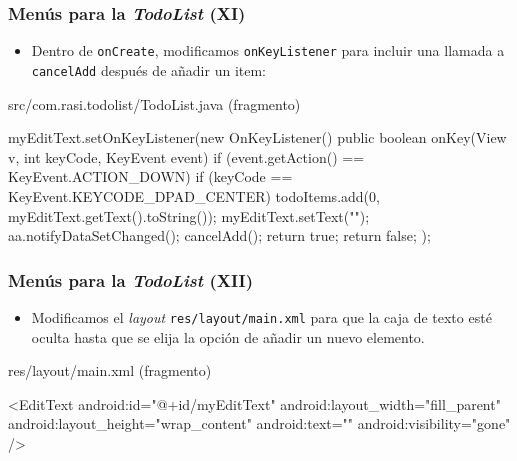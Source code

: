 \documentclass[hyperref={pdfpagelabels=true},ucs]{beamer}
\begin{document}
\begin{frame}[fragile]
\frametitle{Menús para la \emph{TodoList} (XI)}

\begin{itemize}
\item Dentro de \verb|onCreate|, modificamos \verb|onKeyListener| para
  incluir una llamada a \verb|cancelAdd| después de añadir un item:
\end{itemize}

\begin{tiny}
\begin{block}{src/com.rasi.todolist/TodoList.java (fragmento)}
\begin{java}
myEditText.setOnKeyListener(new OnKeyListener() {
  public boolean onKey(View v, int keyCode, KeyEvent event) {
    if (event.getAction() == KeyEvent.ACTION_DOWN)
      if (keyCode == KeyEvent.KEYCODE_DPAD_CENTER)
      {
        todoItems.add(0, myEditText.getText().toString());
        myEditText.setText("");
        aa.notifyDataSetChanged();
        cancelAdd();
        return true;
      }
    return false;
  }
});
\end{java}
\end{block}
\end{tiny}

\end{frame}


\begin{frame}[fragile]
\frametitle{Menús para la \emph{TodoList} (XII)}

\begin{itemize}
\item Modificamos el \emph{layout} \verb|res/layout/main.xml| para que
  la caja de texto esté oculta hasta que se elija la opción de
  añadir un nuevo elemento.
\end{itemize}

\begin{tiny}
\begin{block}{res/layout/main.xml (fragmento)}
\begin{xml}
<EditText
   android:id="@+id/myEditText"
   android:layout_width="fill_parent"
   android:layout_height="wrap_content"
   android:text=""
   android:visibility="gone"
/>
\end{xml}
\end{block}
\end{tiny}

\end{frame}
\end{document}
